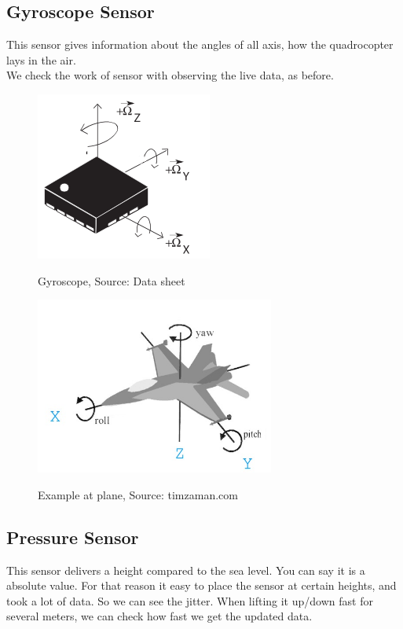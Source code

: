 \subsection{Gyroscope Sensor}

This sensor gives information about the angles of all axis, how the quadrocopter lays in the air.\\
We check the work of sensor with observing the live data, as before.

\begin{figure}[H]
	\centering
		\includegraphics{fig/Gyroscope.png}%
	\label{fig:IMU_Gyro}
	\caption{Gyroscope, Source: Data sheet}
\end{figure}


\begin{figure}[H]
	\centering
		\includegraphics[width=0.7\textwidth]{fig/timzaman.jpg}%
	\label{fig:IMU_Gyro}
	\caption{Example at plane, Source: timzaman.com}
\end{figure}



\subsection{Pressure Sensor}

This sensor delivers a height compared to the sea level. You can say it is a absolute value.
For that reason it easy to place the sensor at certain heights, and took a lot of data. So we can see the jitter. When lifting it up/down fast for several meters, we can check how fast we get the updated data.

